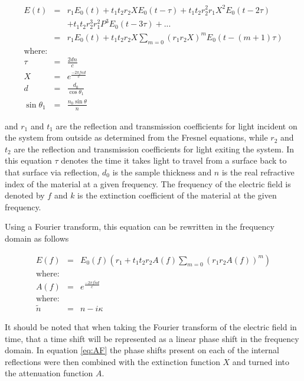 \begin{eqnarray}
E(t) &=& r_{1}E_{0}(t) + t_{1}t_{2}r_{2}XE_{0}(t-\tau) + t_{1}t_{2}r^{2}_{2}r_{1}X^{2}E_{0}(t-2\tau)\nonumber\\ 
& & + t_{1}t_{2}r^{3}_{2}r^{2}_{1}P^{3}E_{0}(t-3\tau) + ...\nonumber\\
&=& r_{1}E_{0}(t) + t_{1}t_{2}r_{2}X\sum_{m=0}(r_{1}r_{2}X)^{m}E_{0}(t - (m + 1)\tau)\\
\mbox{where:}\nonumber\\
\tau &=& \frac{2dn}{c}\\
X &=& e^{\frac{-2\pi f\kappa d}{c}}\\
d &=& \frac{d_{0}}{\cos{\theta_{1}}}\\
\sin{\theta_{1}} &=& \frac{n_{0}\sin{\theta}}{n}
\label{eq:Single layer time domain Transport function}
\end{eqnarray}

and $r_{1}$ and $t_{1}$ are the reflection and transmission coefficients for light incident on the system from outside as determined from the Fresnel equations, while $r_{2}$ and $t_{2}$ are the reflection and transmission coefficients for light exiting the system. In this equation $\tau$ denotes the time it takes light to travel from a surface back to that surface via reflection, $d_{0}$ is the sample thickness and $n$ is the real refractive index of the material at a given frequency. The frequency of the electric field is denoted by $f$ and $k$ is the extinction coefficient of the material at the given frequency.

Using a Fourier transform, this equation can be rewritten in the frequency domain as follows

\begin{eqnarray}
E(f) &=& E_{0}(f)(r_{1} + t_{1}t_{2}r_{2}A(f)\sum_{m=0}(r_{1}r_{2}A(f))^{m})\label{eq:Single layer frequency domain Transport function}\\
\mbox{where:}\nonumber\\
A(f) &=& e^{\frac{-2\pi f\widetilde{n}d}{c}}\label{eq:AF}\\
\mbox{where:}\nonumber\\
\widetilde{n} &=& n - i\kappa
\label{eq:CR}
\end{eqnarray}

It should be noted that when taking the Fourier transform of the electric field in time, that a time shift will be represented as a linear phase shift in the frequency domain. In equation \ref{eq:AF} the phase shifts present on each of the internal reflections were then combined with the extinction function $X$ and turned into the attenuation function $A$.

